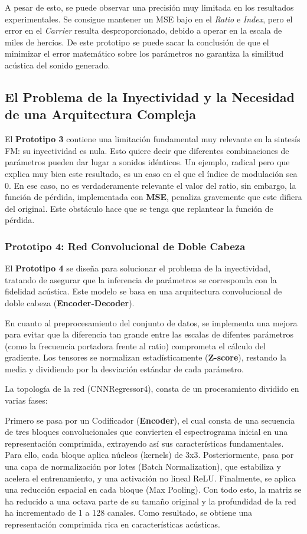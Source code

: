 \documentclass[12pt, a4paper]{article}
\begin{document}
A pesar de esto, se puede observar una precisión muy limitada en los resultados experimentales.
Se consigue mantener un MSE bajo en el \textit{Ratio} e \textit{Index}, pero el error en el
\textit{Carrier} resulta desproporcionado, debido a operar en la escala de miles de hercios. 
De este prototipo se puede sacar la conclusión de que el minimizar el error matemático sobre los
parámetros no garantiza la similitud acústica del sonido generado. 


\subsection{El Problema de la Inyectividad y la Necesidad de una Arquitectura Compleja}
El \textbf{Prototipo 3} contiene una limitación fundamental muy relevante en la sintesís FM:
su inyectividad es nula. Esto quiere decir que diferentes combinaciones de parámetros pueden dar lugar
a sonidos idénticos. Un ejemplo, radical pero que explica muy bien este resultado, es un caso en el que
el índice de modulación sea 0. En ese caso, no es verdaderamente relevante el valor del ratio, sin embargo, 
la función de pérdida, implementada con \textbf{MSE}, penaliza gravemente que este difiera del original. 
Este obstáculo hace que se tenga que replantear la función de pérdida.

\subsubsection{Prototipo 4: Red Convolucional de Doble Cabeza}
El \textbf{Prototipo 4} se diseña para solucionar el problema de la inyectividad, tratando de asegurar
que la inferencia de parámetros se corresponda con la fidelidad acústica. Este modelo se basa en una 
arquitectura convolucional de doble cabeza (\textbf{Encoder-Decoder}).

En cuanto al preprocesamiento del conjunto de datos, se implementa una mejora para evitar que la diferencia 
tan grande entre las escalas de difentes parámetros (como la frecuencia portadora frente al ratio) comprometa
el cálculo del gradiente. Los tensores se normalizan estadísticamente (\textbf{Z-score}), restando la media y 
dividiendo por la desviación estándar de cada parámetro. 

La topología de la red (CNNRegressor4), consta de un procesamiento dividido en varias fases:

Primero se pasa por un Codificador (\textbf{Encoder}), el cual consta de una secuencia de tres bloques
convolucionales que convierten el espectrograma inicial en una representación comprimida, extrayendo así sus 
características fundamentales. Para ello, cada bloque aplica núcleos (kernels) de 3x3. Posteriormente, 
pasa por una capa de normalización por lotes (Batch Normalization), que estabiliza y acelera el entrenamiento, y 
una activación no lineal ReLU. Finalmente, se aplica una reducción espacial en cada bloque (Max Pooling).
Con todo esto, la matriz se ha reducido a una octava parte de su tamaño original y la profundidad de la red
ha incrementado de 1 a 128 canales. Como resultado, se obtiene una representación comprimida
rica en características acústicas.
\end{document}
